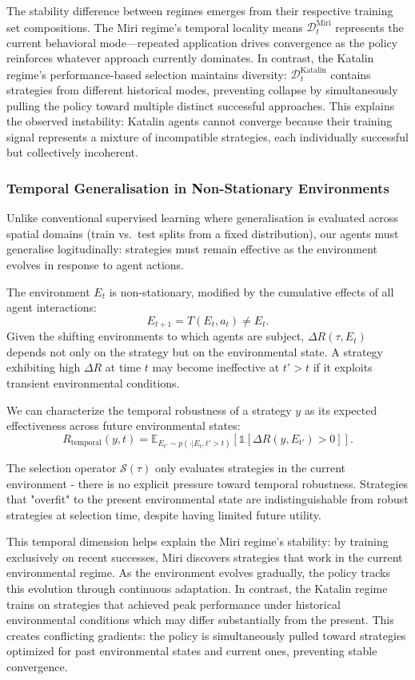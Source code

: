 \documentclass{article}
\begin{document}
The stability difference between regimes emerges from their respective training set compositions. The Miri regime's temporal locality means $\mathcal{D}_t^{\text{Miri}}$ represents the current behavioral mode—repeated application drives convergence as the policy reinforces whatever approach currently dominates. In contrast, the Katalin regime's performance-based selection maintains diversity: $\mathcal{D}_t^{\text{Katalin}}$ contains strategies from different historical modes, preventing collapse by simultaneously pulling the policy toward multiple distinct successful approaches. This explains the observed instability: Katalin agents cannot converge because their training signal represents a mixture of incompatible strategies, each individually successful but collectively incoherent.

\subsubsection{Temporal Generalisation in Non-Stationary Environments}

Unlike conventional supervised learning where generalisation is evaluated across spatial domains (train vs.\ test splits from a fixed distribution), our agents must generalise logitudinally: strategies must remain effective as the environment evolves in response to agent actions.

The environment $E_t$ is non-stationary, modified by the cumulative effects of all agent interactions:
\[
E_{t+1} = T(E_t, a_t) \neq E_t.
\]
Given the shifting environments to which agents are subject, $\Delta R(\tau, E_t)$ depends not only on the strategy but on the environmental state. A strategy exhibiting high $\Delta R$ at time $t$ may become ineffective at $t' > t$ if it exploits transient environmental conditions.

We can characterize the temporal robustness of a strategy $y$ as its expected effectiveness across future environmental states:
\[
R_{\text{temporal}}(y, t) = \mathbb{E}_{E_{t'} \sim p(\cdot | E_t, t' > t)} [\mathbb{1}[\Delta R(y, E_{t'}) > 0]].
\]

The selection operator $\mathcal{S}(\tau)$ only evaluates strategies in the current environment - there is no explicit pressure toward temporal robustness. Strategies that "overfit" to the present environmental state are indistinguishable from robust strategies at selection time, despite having limited future utility.

This temporal dimension helps explain the Miri regime's stability: by training exclusively on recent successes, Miri discovers strategies that work in the current environmental regime. As the environment evolves gradually, the policy tracks this evolution through continuous adaptation. In contrast, the Katalin regime trains on strategies that achieved peak performance under historical environmental conditions which may differ substantially from the present. This creates conflicting gradients: the policy is simultaneously pulled toward strategies optimized for past environmental states and current ones, preventing stable convergence.
\end{document}
